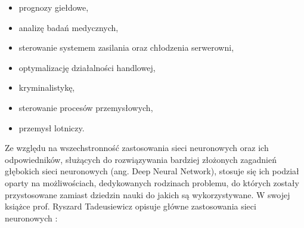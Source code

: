 \begin{itemize}
	\item prognozy giełdowe,
	\item analizę badań medycznych,
	\item sterowanie systemem zasilania oraz chłodzenia serwerowni,
	\item optymalizację działalności handlowej,
	\item kryminalistykę,
	\item sterowanie procesów przemysłowych,
	\item przemysł lotniczy.
\end{itemize}

Ze względu na wszechstronność zastosowania sieci neuronowych oraz ich odpowiedników, służących do rozwiązywania bardziej złożonych zagadnień głębokich sieci neuronowych (ang. Deep Neural Network), stosuje się ich podział oparty na możliwościach, dedykowanych rodzinach problemu, do których zostały przystosowane zamiast dziedzin nauki do jakich są wykorzystywane.
W swojej książce prof. Ryszard Tadeusiewicz opisuje główne zastosowania sieci neuronowych \cite{tade93}:

